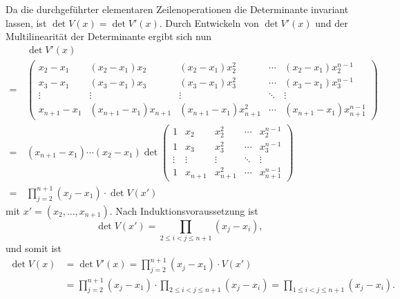\documentclass[a4paper,10pt]{article}
\begin{document}
Da die durchgeführter elementaren Zeilenoperationen die Determinante invariant lassen, ist $\det V(x) = \det V'(x)$. Durch Entwickeln von $\det V'(x)$ und der Multilinearität der Determinante ergibt sich nun
\begin{align*}
  &\, \det V'(x) \\
 =&\,
 \begin{pmatrix}
   x_2 - x_1   & (x_2 - x_1)x_2       & (x_2 - x_1)x_2^2       & \cdots & (x_2 - x_1)x_2^{n-1}  \\
   x_3 - x_1   & (x_3 - x_1)x_3       & (x_3 - x_1)x_3^2       & \cdots & (x_3 - x_1)x_3^{n-1}  \\
   \vdots      & \vdots               & \vdots                 & \ddots & \vdots                \\
   x_{n+1}-x_1 & (x_{n+1}-x_1)x_{n+1} & (x_{n+1}-x_1)x_{n+1}^2 & \cdots & (x_{n+1}-x_1)x_{n+1}^{n-1}
  \end{pmatrix} \\
 =&\,
 (x_{n+1}-x_1) \dotsm (x_2-x_1) \det
 \begin{pmatrix}
   1      & x_2     & x_2^2     & \cdots & x_2^{n-1}     \\
   1      & x_3     & x_3^2     & \cdots & x_3^{n-1}     \\
   \vdots & \vdots  & \vdots    & \ddots & \vdots        \\
   1      & x_{n+1} & x_{n+1}^2 & \cdots & x_{n+1}^{n-1}
  \end{pmatrix} \\
 =&\,
 \prod_{j=2}^{n+1} (x_j - x_1) \cdot \det V(x')
\end{align*}
mit $x' = (x_2, \dotsc, x_{n+1})$. Nach Induktionsvoraussetzung ist
\[
 \det V(x') = \prod_{2 \leq i < j \leq n+1} (x_j - x_i),
\]
und somit ist
\begin{align*}
 \det V(x)
 &= \det V'(x)
 = \prod_{j=2}^{n+1} (x_j - x_1) \cdot V(x') \\
 &= \prod_{j=2}^{n+1} (x_j - x_1) \cdot \prod_{2 \leq i < j \leq n+1} (x_j - x_i)
 = \prod_{1 \leq i < j \leq n+1} (x_j - x_i).
\end{align*}
\end{document}
